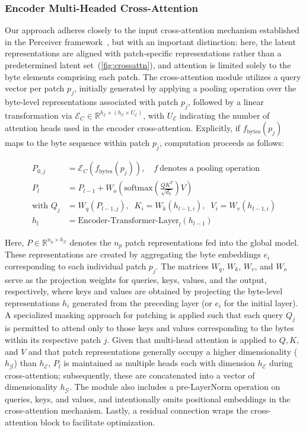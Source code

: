\subsubsection{Encoder Multi-Headed Cross-Attention}
\label{sec:enc-cross-attn}
Our approach adheres closely to the input cross-attention mechanism established in the Perceiver framework~\citep{jaegle2021perceiver}, but with an important distinction: here, the latent representations are aligned with patch-specific representations rather than a predetermined latent set~(\autoref{fig:crossattn}), and attention is limited solely to the byte elements comprising each patch. The cross-attention module utilizes a query vector per patch $p_j$, initially generated by applying a pooling operation over the byte-level representations associated with patch $p_j$, followed by a linear transformation via $\mathcal{E}_{C} \in \mathbb{R}^{h_{\mathcal{E}} \times (h_{\mathcal{E}} \times U_{\mathcal{E}})}$, with $U_{\mathcal{E}}$ indicating the number of attention heads used in the encoder cross-attention. Explicitly, if $f_{\text{bytes}}(p_j)$ maps to the byte sequence within patch $p_j$, computation proceeds as follows:

\begin{align}
P_{0,j} &= \mathcal{E}_{C}(f_\text{bytes}(p_j)), \quad f~ \text{denotes a pooling operation} \\
P_l &= P_{l-1} + W_o\left(\text{softmax}\left(\frac{QK^T}{\sqrt{d_k}}\right)V\right) \\
\text{with } Q_j &= W_q(P_{l-1,j}), \;\; K_i = W_k(h_{l-1,i}), \;\; V_i = W_v(h_{l-1,i}) \\
h_l &= \text{Encoder-Transformer-Layer}_l(h_{l-1})
\end{align}

Here, $P \in \mathbb{R}^{n_p \times h_{\mathcal{G}}}$ denotes the $n_p$ patch representations fed into the global model. These representations are created by aggregating the byte embeddings $e_i$ corresponding to each individual patch $p_j$. The matrices $W_q$, $W_k$, $W_v$, and $W_o$ serve as the projection weights for queries, keys, values, and the output, respectively, where keys and values are obtained by projecting the byte-level representations $h_i$ generated from the preceding layer (or $e_i$ for the initial layer). A specialized masking approach for patching is applied such that each query $Q_j$ is permitted to attend only to those keys and values corresponding to the bytes within its respective patch $j$. Given that multi-head attention is applied to $Q, K,$ and $V$ and that patch representations generally occupy a higher dimensionality ($h_{\mathcal{G}}$) than $h_{\mathcal{E}}$, $P_l$ is maintained as multiple heads each with dimension $h_{\mathcal{E}}$ during cross-attention; subsequently, these are concatenated into a vector of dimensionality $h_{\mathcal{G}}$. The module also includes a pre-LayerNorm operation on queries, keys, and values, and intentionally omits positional embeddings in the cross-attention mechanism. Lastly, a residual connection wraps the cross-attention block to facilitate optimization.

